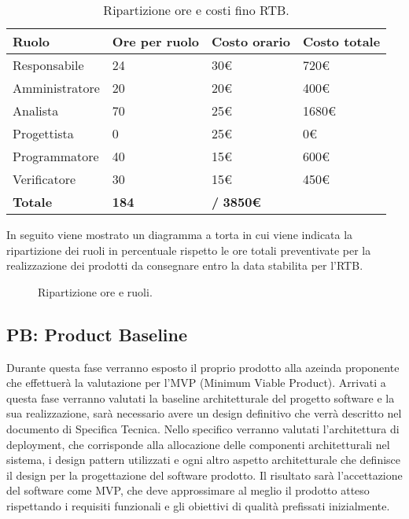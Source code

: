 \begin{table}[!h]
    \centering
    \begin{tabularx}{\textwidth}{| X | X | X | X |}
        \hline
            \textbf{Ruolo} &  
            \textbf{Ore per ruolo} & 
            \textbf{Costo orario} &
            \textbf{Costo totale} \\
        \hline
        \hline
            Responsabile & 24 & 30€ & 720€ \\
        \hline
            Amministratore & 20 & 20€ & 400€ \\
        \hline 
            Analista & 70 & 25€ & 1680€ \\
        \hline 
            Progettista & 0 & 25€ & 0€ \\
        \hline 
            Programmatore & 40 & 15€ & 600€ \\
        \hline 
            Verificatore & 30 & 15€ & 450€ \\
        \hline 
        \textbf{Totale} & \textbf{184} & \textbf{/} \textbf{3850€} \\ 
        \hline  
    \end{tabularx}
    \caption{Ripartizione ore e costi fino RTB.}
    \label{tab:stima_costi} 
\end{table}

In seguito viene mostrato un diagramma a torta in cui viene indicata la ripartizione dei ruoli in percentuale rispetto le ore totali preventivate per la realizzazione dei prodotti da consegnare entro la data stabilita per l'RTB.

\begin{figure}[!h]
    \centering
    \caption{Ripartizione ore e ruoli.}
    \label{fig:pie}
\end{figure}

\subsection{PB: Product Baseline}
Durante questa fase verranno esposto il proprio prodotto alla azeinda proponente che effettuerà la valutazione per l'MVP (Minimum Viable Product).
Arrivati a questa fase verranno valutati la baseline architetturale del progetto software e la sua realizzazione, sarà necessario avere un design definitivo 
che verrà descritto nel documento di Specifica Tecnica.
Nello specifico verranno valutati l'architettura di deployment, che corrisponde alla allocazione delle componenti architetturali nel sistema, 
i design pattern utilizzati e ogni altro aspetto architetturale che definisce il design per la progettazione del software prodotto.
Il risultato sarà l'accettazione del software come MVP, che deve approssimare al meglio il prodotto atteso rispettando i requisiti funzionali 
e gli obiettivi di qualità prefissati inizialmente.